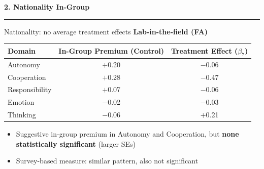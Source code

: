 \documentclass[xcolor=usenames,dvipsnames]{beamer}
\begin{document}
\begin{frame}[plain]
\vspace{2.5cm}
{\Large \textbf{2. Nationality In-Group}}\\
{\color{HopBlue}\rule{0.6\linewidth}{2pt}}
\end{frame}

\begin{frame}{Nationality: no average treatment effects}
\small
\textbf{Lab-in-the-field (FA)}
\footnotesize
\begin{center}
\begin{tabular}{lcc}
\toprule
Domain & In-Group Premium (Control) & Treatment Effect ($\beta_7$) \\
\midrule
Autonomy & $+$0.20 & $-$0.06 \\
Cooperation & $+$0.28 & $-$0.47 \\
Responsibility & $+$0.07 & $-$0.06 \\
Emotion & $-$0.02 & $-$0.03 \\
Thinking & $-$0.06 & $+$0.21 \\
\bottomrule
\end{tabular}
\end{center}
\vspace{0.3cm}
\small
\begin{itemize}
\item[$\Rightarrow$] Suggestive in-group premium in Autonomy and Cooperation, but \textcolor{HopBlue}{\textbf{none statistically significant}} (larger SEs)
\item[$\Rightarrow$] Survey-based measure: similar pattern, also not significant

\end{itemize}
\end{frame}
\end{document}
